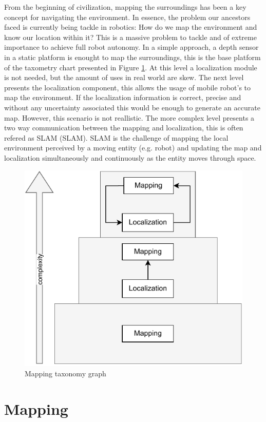 From the beginning of civilization, mapping the surroundings has been a key concept for navigating the environment. In essence, the problem our ancestors faced is currently being tackle in robotics: How do we map the environment and know our location within it? This is a massive problem to tackle and of extreme importance to achieve full robot autonomy. In a simple approach, a depth sensor in a static platform is enought to map the surroundings, this is the base platform of the taxometry chart presented in Figure \ref*{fig: taxonomy graph}. At this level a localization module is not needed, but the amount of uses in real world are skew. The next level presents the localization component, this allows the usage of mobile robot's to map the environment. If the localization information is correct, precise and without any uncertainty associated this would be enough to generate an accurate map. However, this scenario is not reallistic. The more complex level presents a two way communication between the mapping and localization, this is often refered as \acl*{SLAM} (\acs*{SLAM}). \acs*{SLAM} is the challenge of mapping the local environment perceived by a moving entity (e.g. robot) and updating the map and localization simultaneously and continuously as the entity moves through space.

\begin{figure}[H]
    \centering
    \includegraphics[width=0.4\linewidth]{images/background/mapping taxo.pdf}
    \caption{Mapping taxonomy graph}
    \label{fig: taxonomy graph}
\end{figure}


\section{Mapping}

